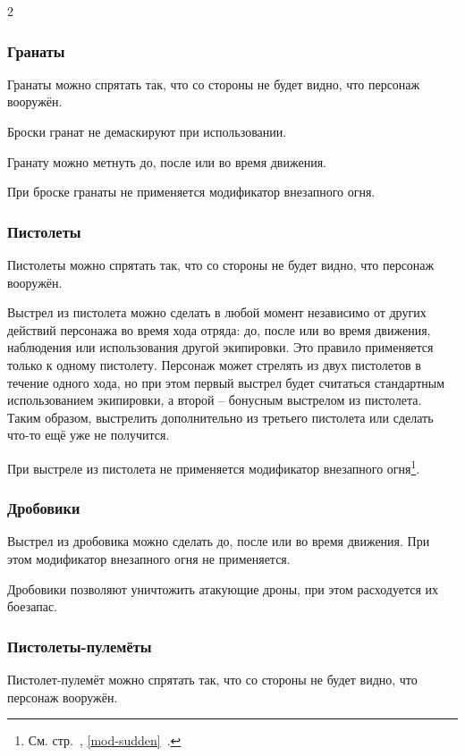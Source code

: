 \documentclass[twoside]{article}
\begin{document}
\begin{multicols}{2}
\subsubsection{Гранаты}\label{grenades}

Гранаты можно спрятать так, что со стороны не будет видно, что
персонаж вооружён.

Броски гранат не демаскируют при использовании.

Гранату можно метнуть до, после или во время движения.

При броске гранаты не применяется модификатор внезапного огня.

\subsubsection{Пистолеты}\label{pistols}

Пистолеты можно спрятать так, что со стороны не будет видно, что
персонаж вооружён.

Выстрел из пистолета можно сделать в любой момент независимо от других
действий персонажа во время хода отряда: до, после или во время
движения, наблюдения или использования другой экипировки. Это правило
применяется только к одному пистолету. Персонаж может стрелять из двух
пистолетов в течение одного хода, но при этом первый выстрел будет
считаться стандартным использованием экипировки, а второй -- бонусным
выстрелом из пистолета. Таким образом, выстрелить дополнительно из
третьего пистолета или сделать что-то ещё уже не получится.

При выстреле из пистолета не применяется модификатор внезапного
огня\footnote{См. стр.~\pageref{mod-sudden}, \ref{mod-sudden}~.}.

\subsubsection{Дробовики}\label{shotguns}

Выстрел из дробовика можно сделать до, после или во время движения. При
этом модификатор внезапного огня не применяется.

Дробовики позволяют уничтожить атакующие дроны, при этом расходуется их
боезапас.

\subsubsection{Пистолеты-пулемёты}\label{smgs}

Пистолет-пулемёт можно спрятать так, что со стороны не будет видно, что персонаж вооружён.


\end{multicols}
\end{document}
